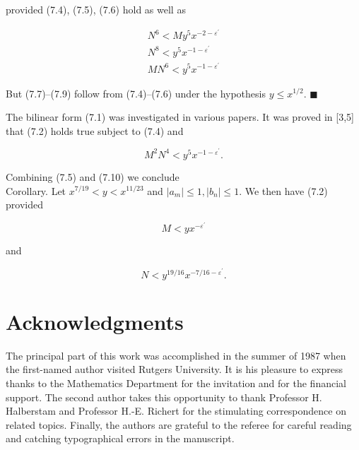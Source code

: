 \documentclass[10pt]{article}
\newcommand{\proofend}{\hfill\(\blacksquare\)}
\begin{document}
provided (7.4), (7.5), (7.6) hold as well as


\begin{gather*}
N^{6}<M y^{5} x^{-2-\varepsilon^{\prime}}  \tag{7.7}\\
N^{8}<y^{5} x^{-1-\varepsilon^{\prime}}  \tag{7.8}\\
M N^{6}<y^{5} x^{-1-\varepsilon^{\prime}} \tag{7.9}
\end{gather*}


But (7.7)--(7.9) follow from (7.4)--(7.6) under the hypothesis $y\leqslant x^{1/2}$. \proofend

The bilinear form (7.1) was investigated in various papers. It was proved in [3,5] that (7.2) holds true subject to (7.4) and


\begin{equation*}
M^{2} N^{4}<y^{5} x^{-1-\varepsilon^{\prime}} . \tag{7.10}
\end{equation*}


Combining (7.5) and (7.10) we conclude\\
Corollary. Let $x^{7 / 19}<y<x^{11 / 23}$ and $\left|a_{m}\right| \leqslant 1,\left|b_{n}\right| \leqslant 1$. We then have (7.2) provided


\begin{equation*}
M<y x^{-\varepsilon^{\prime}} \tag{7.4}
\end{equation*}


and


\begin{equation*}
N<y^{19 / 16} x^{-7 / 16-\varepsilon^{\prime}} . \tag{7.11}
\end{equation*}


\section*{Acknowledgments}
The principal part of this work was accomplished in the summer of 1987 when the first-named author visited Rutgers University. It is his pleasure to express thanks to the Mathematics Department for the invitation and for the financial support. The second author takes this opportunity to thank Professor H. Halberstam and Professor H.-E. Richert for the stimulating correspondence on related topics. Finally, the authors are grateful to the referee for careful reading and catching typographical errors in the manuscript.
\end{document}
